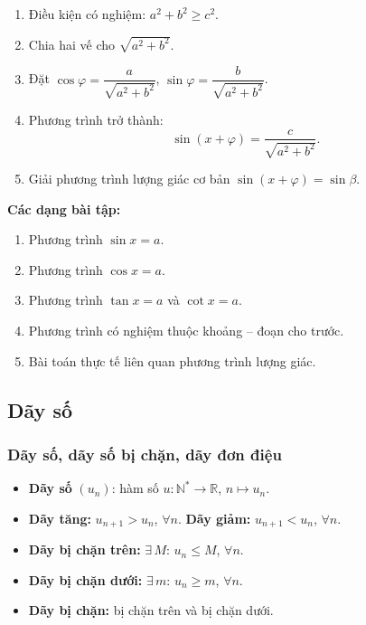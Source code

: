 \documentclass[12pt,a4paper]{article}
\begin{document}
\begin{phuongphap}[title={Phương trình $a\sin x + b\cos x = c$}]
  \begin{enumerate}
    \item Điều kiện có nghiệm: $a^2 + b^2 \ge c^2$.
    \item Chia hai vế cho $\sqrt{a^2 + b^2}$.
    \item Đặt $\cos\varphi = \dfrac{a}{\sqrt{a^2 + b^2}}$, \;$\sin\varphi = \dfrac{b}{\sqrt{a^2 + b^2}}$.
    \item Phương trình trở thành:
      \[
        \sin(x + \varphi) = \frac{c}{\sqrt{a^2 + b^2}}.
      \]
    \item Giải phương trình lượng giác cơ bản $\sin(x + \varphi) = \sin\beta$.
  \end{enumerate}
\end{phuongphap}

\medskip\noindent\textbf{Các dạng bài tập:}
\begin{enumerate}[label=\textbf{Dạng \arabic*:}, leftmargin=*, align=left]
  \item Phương trình $\sin x = a$.
  \item Phương trình $\cos x = a$.
  \item Phương trình $\tan x = a$ và $\cot x = a$.
  \item Phương trình có nghiệm thuộc khoảng -- đoạn cho trước.
  \item Bài toán thực tế liên quan phương trình lượng giác.
\end{enumerate}

\subsection{Dãy số}

\subsubsection{Dãy số, dãy số bị chặn, dãy đơn điệu}

\begin{dinhnghia}
  \begin{itemize}
    \item \textbf{Dãy số} $(u_n)$: hàm số $u \colon \mathbb{N}^{*} \to \mathbb{R}$, \;$n \mapsto u_n$.
    \item \textbf{Dãy tăng:} $u_{n+1} > u_n$, $\forall n$. \quad
          \textbf{Dãy giảm:} $u_{n+1} < u_n$, $\forall n$.
    \item \textbf{Dãy bị chặn trên:} $\exists\, M$: \;$u_n \le M$, \;$\forall n$.
    \item \textbf{Dãy bị chặn dưới:} $\exists\, m$: \;$u_n \ge m$, \;$\forall n$.
    \item \textbf{Dãy bị chặn:} bị chặn trên và bị chặn dưới.
  \end{itemize}
\end{dinhnghia}
\end{document}

